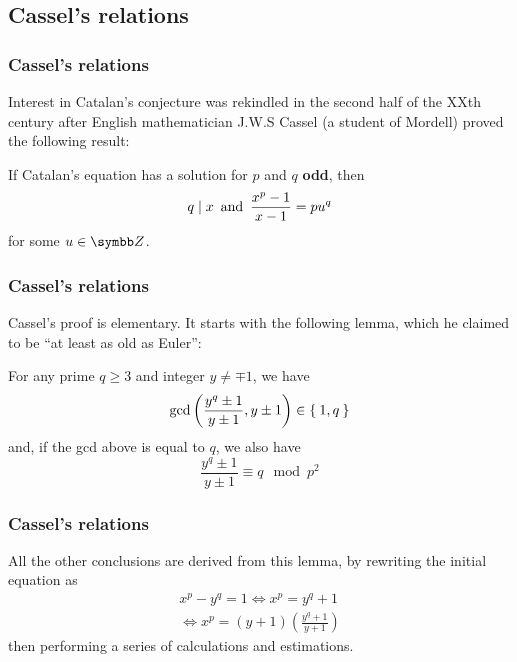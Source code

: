\subsection{Cassel's relations}

\begin{frame}
\frametitle{Cassel's relations}

Interest in Catalan's conjecture was rekindled in the second half of the XXth century after English mathematician J.W.S Cassel (a student of Mordell) proved the following result:

\begin{theorem}[Cassel, 1960]
If Catalan's equation has a solution for \(p\) and \(q\) \textbf{odd}, then
\[
    q \mid x \, \text{ and } \, \frac{x^p - 1}{x - 1} = p u^q
\]
for some \(u \in \integers\).
\end{theorem}
\end{frame}

\begin{frame}
\frametitle{Cassel's relations}

Cassel's proof \cite{Cassels1960} is elementary. It starts with the following lemma, which he claimed to be ``at least as old as Euler'':
\begin{lemma}
For any prime \(q \geq 3\) and integer \(y \neq \mp 1\), we have
\[
    \gcd \left(\frac{y^q \pm 1}{y \pm 1}, y \pm 1\right) \in \Set{ 1, q }
\]
and, if the gcd above is equal to \(q\), we also have
\[
    \frac{y^q \pm 1}{y \pm 1} \equiv q \mod{p^2}
\]
\end{lemma}
\end{frame}

\begin{frame}
\frametitle{Cassel's relations}

All the other conclusions are derived from this lemma, by rewriting the initial equation as
\begin{gather*}
    x^p - y^q = 1 \iff x^p = y^q + 1 \\[0.75em]
    \iff
    x^p = (y + 1) \left(\frac{y^q + 1}{y + 1}\right)
\end{gather*}
then performing a series of calculations and estimations.
\end{frame}
